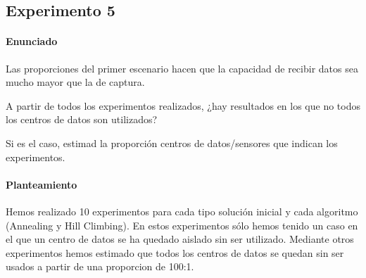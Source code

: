 \subsection{Experimento 5}
\paragraph{Enunciado}
Las proporciones del primer escenario hacen que la capacidad de recibir datos sea mucho mayor que la de captura.

A partir de todos los experimentos realizados, ¿hay resultados en los que no todos los centros de datos son utilizados?

Si es el caso, estimad la proporción centros de datos/sensores que indican los experimentos.
\paragraph{Planteamiento}
Hemos realizado 10 experimentos para cada tipo solución inicial y cada algoritmo (Annealing y Hill Climbing). En estos experimentos sólo hemos tenido un caso en el que un centro de datos se ha quedado aislado sin ser utilizado.
Mediante otros experimentos hemos estimado que todos los centros de datos se quedan sin ser usados a partir de una proporcion de 100:1.